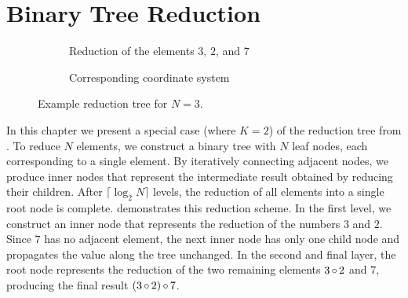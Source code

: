 \chapter{Binary Tree Reduction}
\label{ch:BinaryTreeSummation}

\newcommand{\numLevels}{\lceil \log_2 N \rceil}
\newcommand{\ffs}{\textrm{ffs}}
\newcommand{\nodesum}{\textrm{sum}\,}

\begin{figure}[H]
\centering
\begin{subfigure}{0.45\textwidth}
\centering
{}
\caption{Reduction of the elements $3$, $2$, and $7$}
\label{fig:reductionExample}
\end{subfigure}
\hfill
\begin{subfigure}{0.45\textwidth}
\centering
{}
\caption{Corresponding coordinate system}
\label{fig:coordinateExample}
\end{subfigure}

\caption{Example reduction tree for $N=3$.}
\label{fig:reductionAndCoordinateExample}
\end{figure}

In this chapter we present a special case (where $K = 2$) of the reduction tree from .
To reduce $N$ elements, we construct a binary tree with $N$ leaf nodes, each corresponding to a single element.
By iteratively connecting adjacent nodes, we produce inner nodes that represent the intermediate result obtained by reducing their children.
After $\numLevels$ levels, the reduction of all elements into a single root node is complete.
 demonstrates this reduction scheme.
In the first level, we construct an inner node that represents the reduction of the numbers $3$ and $2$.
Since $7$ has no adjacent element, the next inner node has only one child node and propagates the value along the tree unchanged.
In the second and final layer, the root node represents the reduction of the two remaining elements $3 \operatorname{\circ} 2$ and $7$, producing the final result $(3 \operatorname{\circ} 2) \operatorname{\circ} 7$.

